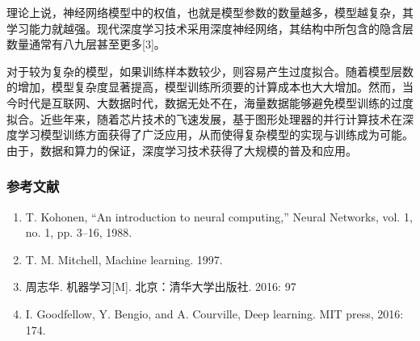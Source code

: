 理论上说，神经网络模型中的权值，也就是模型参数的数量越多，模型越复杂，其学习能力就越强。现代深度学习技术采用深度神经网络，其结构中所包含的隐含层数量通常有八九层甚至更多[3]。

对于较为复杂的模型，如果训练样本数较少，则容易产生过度拟合。随着模型层数的增加，模型复杂度显著提高，模型训练所须要的计算成本也大大增加。然而，当今时代是互联网、大数据时代，数据无处不在，海量数据能够避免模型训练的过度拟合。近些年来，随着芯片技术的飞速发展，基于图形处理器的并行计算技术在深度学习模型训练方面获得了广泛应用，从而使得复杂模型的实现与训练成为可能。由于，数据和算力的保证，深度学习技术获得了大规模的普及和应用。



\subsubsection{参考文献}
\begin{enumerate}
\item T. Kohonen, “An introduction to neural computing,” Neural Networks, vol. 1, no. 1, pp. 3–16, 1988.
\item T. M. Mitchell, Machine learning. 1997.
\item 周志华. 机器学习[M]. 北京：清华大学出版社. 2016: 97
\item I. Goodfellow, Y. Bengio, and A. Courville, Deep learning. MIT press, 2016: 174.
\end{enumerate}